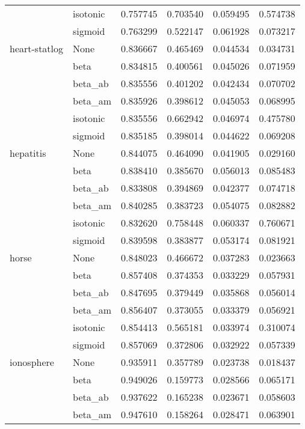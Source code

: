 \begin{tabular}{llrrrr}
        & isotonic &  0.757745 &  0.703540 &  0.059495 &  0.574738 \\
        & sigmoid &  0.763299 &  0.522147 &  0.061928 &  0.073217 \\
heart-statlog & None &  0.836667 &  0.465469 &  0.044534 &  0.034731 \\
        & beta &  0.834815 &  0.400561 &  0.045026 &  0.071959 \\
        & beta\_ab &  0.835556 &  0.401202 &  0.042434 &  0.070702 \\
        & beta\_am &  0.835926 &  0.398612 &  0.045053 &  0.068995 \\
        & isotonic &  0.835556 &  0.662942 &  0.046974 &  0.475780 \\
        & sigmoid &  0.835185 &  0.398014 &  0.044622 &  0.069208 \\
hepatitis & None &  0.844075 &  0.464090 &  0.041905 &  0.029160 \\
        & beta &  0.838410 &  0.385670 &  0.056013 &  0.085483 \\
        & beta\_ab &  0.833808 &  0.394869 &  0.042377 &  0.074718 \\
        & beta\_am &  0.840285 &  0.383723 &  0.054075 &  0.082882 \\
        & isotonic &  0.832620 &  0.758448 &  0.060337 &  0.760671 \\
        & sigmoid &  0.839598 &  0.383877 &  0.053174 &  0.081921 \\
horse & None &  0.848023 &  0.466672 &  0.037283 &  0.023663 \\
        & beta &  0.857408 &  0.374353 &  0.033229 &  0.057931 \\
        & beta\_ab &  0.847695 &  0.379449 &  0.035868 &  0.056014 \\
        & beta\_am &  0.856407 &  0.373055 &  0.033379 &  0.056921 \\
        & isotonic &  0.854413 &  0.565181 &  0.033974 &  0.310074 \\
        & sigmoid &  0.857069 &  0.372806 &  0.032922 &  0.057339 \\
ionosphere & None &  0.935911 &  0.357789 &  0.023738 &  0.018437 \\
        & beta &  0.949026 &  0.159773 &  0.028566 &  0.065171 \\
        & beta\_ab &  0.937622 &  0.165238 &  0.023671 &  0.058603 \\
        & beta\_am &  0.947610 &  0.158264 &  0.028471 &  0.063901 \\

\end{tabular}
